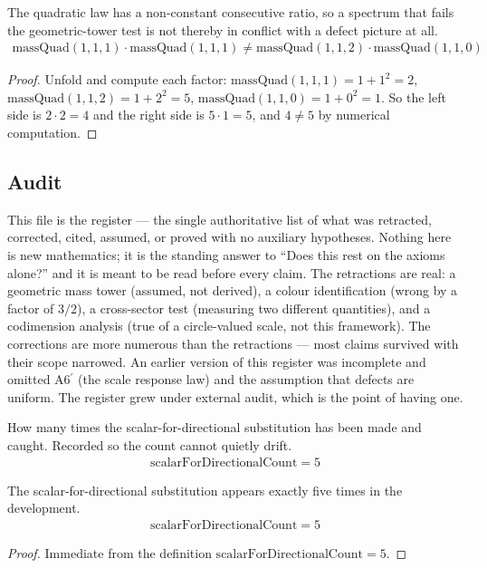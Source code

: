 \begin{theorem}
The quadratic law has a non-constant consecutive ratio, so a spectrum that fails the geometric-tower test is not thereby in conflict with a defect picture at all.
\begin{align*}
\text{massQuad}(1, 1, 1) \cdot \text{massQuad}(1, 1, 1) \neq \text{massQuad}(1, 1, 2) \cdot \text{massQuad}(1, 1, 0)
\end{align*}
\begin{proof}
Unfold and compute each factor: $\text{massQuad}(1,1,1)=1+1^2=2$, $\text{massQuad}(1,1,2)=1+2^2=5$, $\text{massQuad}(1,1,0)=1+0^2=1$. So the left side is $2\cdot2=4$ and the right side is $5\cdot1=5$, and $4\neq5$ by numerical computation.
\end{proof}
\end{theorem}

\subsection{Audit}

This file is the register — the single authoritative list of what was retracted, corrected, cited, assumed, or proved with no auxiliary hypotheses. Nothing here is new mathematics; it is the standing answer to ``Does this rest on the axioms alone?'' and it is meant to be read before every claim.  The retractions are real: a geometric mass tower (assumed, not derived), a colour identification (wrong by a factor of $3/2$), a cross-sector test (measuring two different quantities), and a codimension analysis (true of a circle-valued scale, not this framework). The corrections are more numerous than the retractions — most claims survived with their scope narrowed. An earlier version of this register was incomplete and omitted A6$^\prime$ (the scale response law) and the assumption that defects are uniform. The register grew under external audit, which is the point of having one.

\begin{definition}
How many times the scalar-for-directional substitution has been made and caught.  Recorded so the count cannot quietly drift.
\begin{align*}
\text{scalarForDirectionalCount} = 5
\end{align*}
\end{definition}

\begin{theorem}
The scalar-for-directional substitution appears exactly five times in the development.
\begin{align*}
\text{scalarForDirectionalCount} = 5
\end{align*}
\begin{proof}
Immediate from the definition $\text{scalarForDirectionalCount}=5$.
\end{proof}
\end{theorem}

